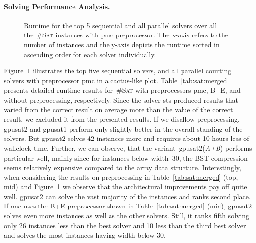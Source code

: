 \documentclass{llncs}
\newcommand{\cSAT}{\textsc{\#Sat}\xspace}%
\newcommand{\gpusatnu}{{\small\textsf{gpusat2}}\xspace}
\newcommand{\gpusatnuv}[1]{{\small\textsf{gpusat2({\textit{#1}})}}\xspace}
\newcommand{\gpusatone}{{\small\textsf{gpusat1}}\xspace}
\begin{document}
\paragraph{Solving Performance Analysis.}
%
%
%
%
%
%
%
%
%
%


\begin{figure}[t]
  \centering
  \caption{Runtime for the top 5 sequential and all parallel solvers over all the~\cSAT instances with pmc preprocessor. %
    The x-axis refers to the number of instances and the y-axis
    depicts the runtime sorted in ascending order for each solver
    individually.  }
  \label{fig:runtime}
\end{figure}
%
Figure~\ref{fig:runtime} illustrates the top five sequential solvers,
and all parallel counting solvers %
%
with preprocessor pmc %
%
in a cactus-like plot. 
Table~\ref{tab:sat:merged} presents detailed runtime
results for~\cSAT with preprocessors pmc, B+E, and without preprocessing, respectively.
%
%
%
%
%
%
%
%
%
%
%
%
%
%
%
%
Since the solver sts produced results that varied from the correct
result on average more than the value of the correct result, %
%
%
%
%
%
we excluded it from the presented results.  If we disallow
preprocessing, \gpusatnu and \gpusatone perform only slightly better
in the overall standing of the solvers. But \gpusatnu solves 42
instances more and requires about 10 hours less of wallclock
time. Further, we can observe, that %
the variant~\gpusatnuv{A+B} performs particular well, mainly since for
instances below width~30, the BST compression seems relatively
expensive compared to the array data structure.
%
%
%
%
%
Interestingly, when considering the results on preprocessing in
Table~\ref{tab:sat:merged} (top, mid) and Figure~\ref{fig:runtime} we
observe that the architectural improvements pay off quite
well. \gpusatnu can solve the vast majority of the instances and
ranks second place.  If one uses the B+E preprocessor shown in
Table~\ref{tab:sat:merged} (mid), \gpusatnu solves even more instances
as well as the other solvers. Still, it ranks fifth solving only 26
instances less than the best solver and 10 less than the third best
solver and solves the most instances having width below 30.
\end{document}
